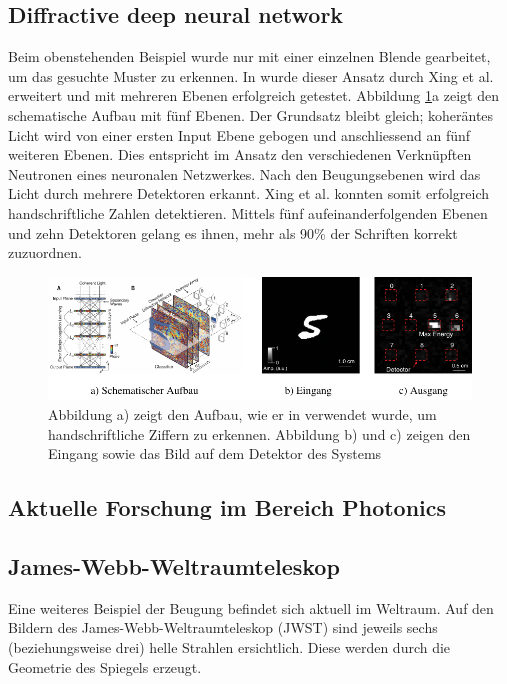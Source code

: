 \subsection{Diffractive deep neural network}
Beim obenstehenden Beispiel wurde nur mit einer einzelnen Blende gearbeitet, um das gesuchte Muster zu erkennen.
In \cite{opt:Lin.2018} wurde dieser Ansatz durch Xing et al. erweitert und mit mehreren Ebenen erfolgreich getestet.
Abbildung \ref{opt:fig:handwriting}a zeigt den schematische Aufbau mit fünf Ebenen.
Der Grundsatz bleibt gleich; koheräntes Licht wird von einer ersten Input Ebene gebogen und anschliessend an fünf weiteren Ebenen.
Dies entspricht im Ansatz den verschiedenen Verknüpften Neutronen eines neuronalen Netzwerkes.
Nach den Beugungsebenen wird das Licht durch mehrere Detektoren erkannt.
Xing et al. konnten somit erfolgreich handschriftliche Zahlen detektieren.
Mittels fünf aufeinanderfolgenden Ebenen und zehn Detektoren gelang es ihnen, mehr als 90\% der Schriften korrekt zuzuordnen.

\begin{figure}
    \centering
    \includegraphics[width=\textwidth]{papers/opt/images/handwriting.pdf}
    \caption{Abbildung a) zeigt den Aufbau, wie er in \cite{opt:Lin.2018} verwendet wurde, um handschriftliche Ziffern zu erkennen.
    Abbildung b) und c) zeigen den Eingang sowie das Bild auf dem Detektor des Systems}
    \label{opt:fig:handwriting}
\end{figure}

\subsection{Aktuelle Forschung im Bereich Photonics}

\subsection{James-Webb-Weltraumteleskop}
Eine weiteres Beispiel der Beugung befindet sich aktuell im Weltraum.
Auf den Bildern des James-Webb-Weltraumteleskop (JWST) sind jeweils sechs (beziehungsweise drei) helle Strahlen ersichtlich.
Diese werden durch die Geometrie des Spiegels erzeugt.

